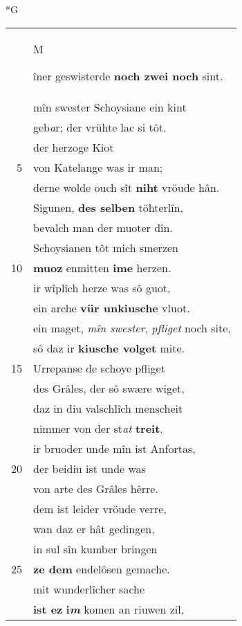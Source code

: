 \documentclass[8pt,a4paper,notitlepage]{article}
\begin{document}
\begin{table}[ht]
\begin{minipage}[t]{0.5\linewidth}
\small
\begin{center}*G
\end{center}
\begin{tabular}{rl}
 & \begin{large}M\end{large}îner geswisterde \textbf{noch zwei noch} sint.\\ 
 & mîn swester Schoysiane ein kint\\ 
 & geb\textit{a}r; der vrühte lac si tôt.\\ 
 & der herzoge Kiot\\ 
5 & von Katelange was ir man;\\ 
 & derne wolde ouch sît \textbf{niht} vröude hân.\\ 
 & Sigunen, \textbf{des selben} töhterlîn,\\ 
 & bevalch man der muoter dîn.\\ 
 & Schoysianen tôt mich smerzen\\ 
10 & \textbf{muoz} enmitten \textbf{ime} herzen.\\ 
 & ir wîplîch herze was sô guot,\\ 
 & ein arche \textbf{vür unkiusche} vluot.\\ 
 & ein maget, \textit{mîn swester}, \textit{pfliget} noch site,\\ 
 & sô daz ir \textbf{kiusche volget} mite.\\ 
15 & Urrepanse de schoye pfliget\\ 
 & des Grâles, der sô swære wiget,\\ 
 & daz in diu valschlîch menscheit\\ 
 & nimmer von der st\textit{at} \textbf{treit}.\\ 
 & ir bruoder unde mîn ist Anfortas,\\ 
20 & der beidiu ist unde was\\ 
 & von arte des Grâles hêrre.\\ 
 & dem ist leider vröude verre,\\ 
 & wan daz er hât gedingen,\\ 
 & in sul sîn kumber bringen\\ 
25 & \textbf{ze dem} endelôsen gemache.\\ 
 & mit wunderlîcher sache\\ 
 & \textbf{ist ez} \textbf{i\textit{m}} komen an riuwen zil,\\ 

\end{tabular}
\end{minipage}
\end{table}
\end{document}
